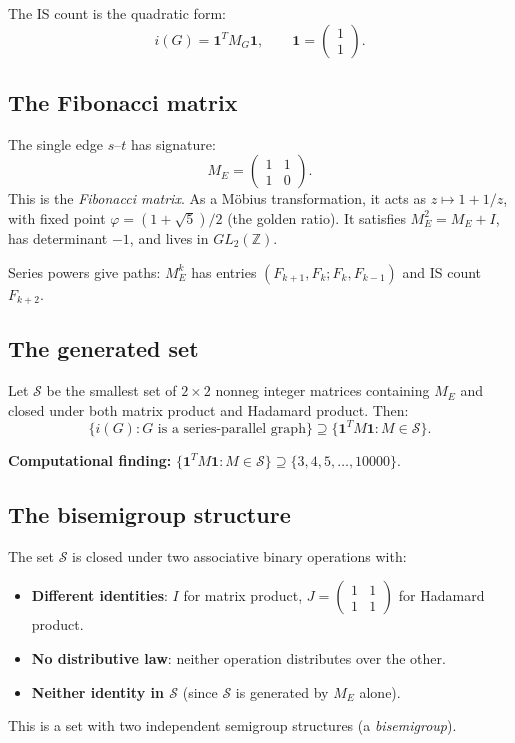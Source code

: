 \documentclass[11pt,a4paper]{article}
\theoremstyle{definition}
\theoremstyle{remark}
\newcommand{\bOne}{\mathbf{1}}
\newcommand{\ZZ}{\mathbb{Z}}
\newcommand{\cS}{\mathcal{S}}
\begin{document}
The IS count is the quadratic form:
\[
i(G) = \bOne^T M_G \bOne, \qquad \bOne = \begin{pmatrix}1\\1\end{pmatrix}.
\]

\subsection{The Fibonacci matrix}

The single edge $s$--$t$ has signature:
\[
M_E = \begin{pmatrix}1&1\\1&0\end{pmatrix}.
\]
This is the \emph{Fibonacci matrix}. As a M\"obius transformation, it acts as $z \mapsto 1 + 1/z$, with fixed point $\varphi = (1+\sqrt{5})/2$ (the golden ratio). It satisfies $M_E^2 = M_E + I$, has determinant $-1$, and lives in $GL_2(\ZZ)$.

Series powers give paths: $M_E^k$ has entries $(F_{k+1}, F_k; F_k, F_{k-1})$ and IS count $F_{k+2}$.

\subsection{The generated set}

Let $\cS$ be the smallest set of $2 \times 2$ nonneg integer matrices containing $M_E$ and closed under both matrix product and Hadamard product. Then:
\[
\{ i(G) : G \text{ is a series-parallel graph} \} \supseteq \{ \bOne^T M \bOne : M \in \cS \}.
\]

\textbf{Computational finding:} $\{ \bOne^T M \bOne : M \in \cS \} \supseteq \{3, 4, 5, \ldots, 10000\}$.

\subsection{The bisemigroup structure}

The set $\cS$ is closed under two associative binary operations with:
\begin{itemize}
  \item \textbf{Different identities}: $I$ for matrix product, $J = \left(\begin{smallmatrix}1&1\\1&1\end{smallmatrix}\right)$ for Hadamard product.
  \item \textbf{No distributive law}: neither operation distributes over the other.
  \item \textbf{Neither identity in $\cS$} (since $\cS$ is generated by $M_E$ alone).
\end{itemize}
This is a set with two independent semigroup structures (a \emph{bisemigroup}).
\end{document}
